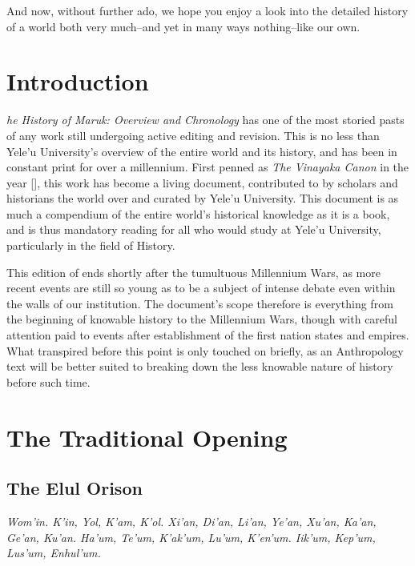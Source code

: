 		And now, without further ado, we hope you enjoy a look into the detailed history of a world both very much--and yet in many ways nothing--like our own. \par
		
		\clearpage  
\restoregeometry
\tableofcontents
\newpage
\thispagestyle{plain}
\chapter*{Introduction}
\label{chap:intro}
	\lettrine[findent=2pt]{}{ }\textit{he History of Maruk: Overview and Chronology} has one of the most storied pasts of any work still undergoing active editing and revision. This is no less than Yele'u University's overview of the entire world and its history, and has been in constant print for over a millennium. First penned as \textit{The Vinayaka Canon} in the year [], this work has become a living document, contributed to by scholars and historians the world over and curated by Yele'u University. This document is as much a compendium of the entire world's historical knowledge as it is a book, and is thus mandatory reading for all who would study at Yele'u University, particularly in the field of History.\par 
	This edition of  ends shortly after the tumultuous Millennium Wars, as more recent events are still so young as to be a subject of intense debate even within the walls of our institution. The document's scope therefore is everything from the beginning of knowable history to the Millennium Wars, though with careful attention paid to events after establishment of the first nation states and empires. What transpired before this point is only touched on briefly, as an Anthropology text will be better suited to breaking down the less knowable nature of history before such time.

\chapter*{The Traditional Opening}
\label{chap:tradopen}

\section{The Elul Orison}

\begin{center}\textit{Wom’in. K’in, Yol, K’am, K’ol. Xi’an, Di’an, Li’an, Ye’an, Xu’an, Ka’an, Ge’an, Ku’an. Ha’um, Te’um, K’ak’um, Lu’um, K’en’um. Iik’um, Kep’um, Lus’um, Enhul’um.}\end{center} 

